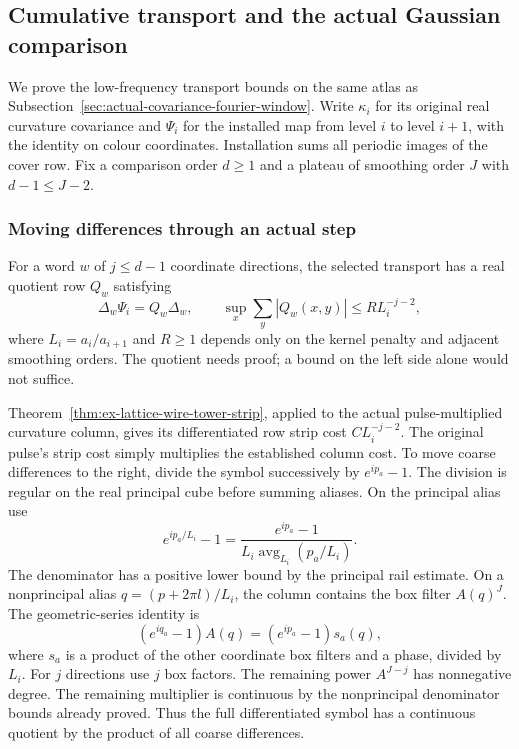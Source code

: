 \subsection{Cumulative transport and the actual Gaussian comparison}
\label{sec:actual-covariance-transport}

We prove the low-frequency transport bounds on the same atlas as
Subsection~\ref{sec:actual-covariance-fourier-window}. Write $\kappa_i$
for its original real curvature covariance and $\Psi_i$ for the
installed map from level $i$ to level $i+1$, with the identity on
colour coordinates. Installation sums all periodic images of the
cover row. Fix a comparison order $d\ge1$ and a plateau of smoothing
order $J$ with $d-1\le J-2$.

\subsubsection{Moving differences through an actual step}

For a word $w$ of $j\le d-1$ coordinate directions, the selected
transport has a real quotient row $Q_w$ satisfying
\begin{equation}\label{eq:actual-transport-difference}
 \Delta_w\Psi_i=Q_w\Delta_w,\qquad
 \sup_x\sum_y|Q_w(x,y)|\le R L_i^{-j-2},
\end{equation}
where $L_i=a_i/a_{i+1}$ and $R\ge1$ depends only on the kernel
penalty and adjacent smoothing orders. The quotient needs proof;
a bound on the left side alone would not suffice.

Theorem~\ref{thm:ex-lattice-wire-tower-strip}, applied to the actual
pulse-multiplied curvature column, gives its differentiated row
strip cost $C L_i^{-j-2}$. The original pulse's strip cost simply
multiplies the established column cost. To move coarse differences
to the right, divide the symbol successively by $e^{ip_a}-1$.
The division is regular on the real principal cube before summing
aliases. On the principal alias use
\[
 e^{ip_a/L_i}-1=
 \frac{e^{ip_a}-1}{L_i\operatorname{avg}_{L_i}(p_a/L_i)}.
\]
The denominator has a positive lower bound by the principal rail
estimate. On a nonprincipal alias $q=(p+2\pi l)/L_i$, the column
contains the box filter $A(q)^J$. The geometric-series identity is
\[
 (e^{iq_a}-1)A(q)=(e^{ip_a}-1)s_a(q),
\]
where $s_a$ is a product of the other coordinate box filters and a
phase, divided by $L_i$. For $j$ directions use $j$ box factors.
The remaining power $A^{J-j}$ has nonnegative degree. The remaining
multiplier is continuous by the nonprincipal denominator bounds
already proved. Thus the full differentiated symbol has a continuous
quotient by the product of all coarse differences.

